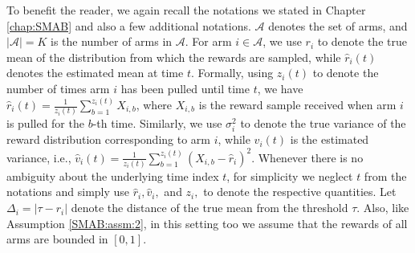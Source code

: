 To benefit the reader, we again recall the notations we stated in Chapter \ref{chap:SMAB} and also a few additional notations. $\mathcal{A}$ denotes the set of arms, and $|\mathcal{A}|=K$ is the number of arms in $\mathcal{A}$. For arm $i\in\mathcal{A}$, we use $r_{i}$ to denote the true mean of the distribution from which the rewards are sampled, while $\hat{r}_{i}(t)$ denotes the estimated mean at time $t$. Formally, using $z_i(t)$ to denote the number of times arm $i$ has been pulled until time $t$, we have $\hat{r}_{i}(t)=\frac{1}{z_{i}(t)}\sum_{b=1}^{z_i(t)} X_{i,b}$, where $X_{i,b}$ is the reward sample received when arm $i$ is pulled for the $b$-th time. %
Similarly, we use $\sigma_{i}^{2}$ to denote the true variance of the reward distribution corresponding to arm $i$, while $\hat{v}_{i}(t)$ is the estimated variance, i.e., $\hat{v}_{i}(t)=\frac{1}{z_i(t)}\sum_{b=1}^{z_{i}(t)}(X_{i,b}-\hat{r}_{i})^{2}$. Whenever there is no ambiguity about the underlying  time index $t$, for simplicity we neglect $t$ from the notations and simply use  $\hat{r}_i, \hat{v}_i,$ and $z_i, $ to denote the respective quantities.  Let  $\Delta_{i}=|\tau-r_{i}|$ denote the distance of the true mean from the threshold $\tau$. Also, like Assumption \ref{SMAB:assm:2}, in this setting too we assume that the rewards of all arms are bounded in $[0,1]$.


